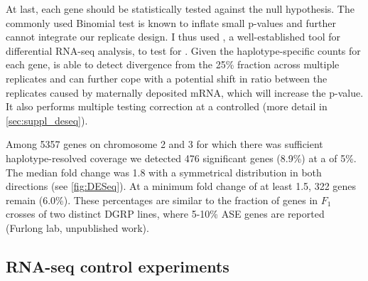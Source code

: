 At last, each gene should be statistically tested against the null
hypothesis. The commonly used Binomial test is known to inflate small p-values
\citep{Harvey2014} and further cannot integrate our replicate design. I thus
used \deseq, a well-established tool for differential RNA-seq analysis, to test
for \ase. Given the haplotype-specific counts for each gene, \deseq is able to
detect divergence from the 25\% fraction across multiple replicates and can
further cope with a potential shift in \ase ratio between the replicates caused
by maternally deposited mRNA, which will increase the p-value. It also performs
multiple testing correction at a controlled \fdr (more detail in
\cref{sec:suppl_deseq}).


Among 5357 genes on chromosome 2 and 3 for which there was sufficient
haplotype-resolved coverage we detected 476 significant \ase genes (8.9\%) at a
\fdr of 5\%. The median fold change was 1.8 with a symmetrical distribution in
both directions (see \cref{fig:DESeq}). At a minimum fold change of at least
1.5, 322 genes remain (6.0\%). These percentages are similar to the fraction of
\ase genes in $F_1$ crosses of two distinct DGRP lines, where 5-10\% ASE genes
are reported (Furlong lab, unpublished work).






\subsection{RNA-seq control experiments}
\label{sec:balancer_ase_controls}

